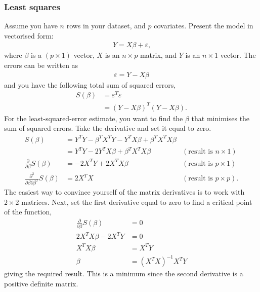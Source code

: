 \documentclass[a4paper]{article}
\begin{document}
\subsubsection{Least squares}
Assume you have $n$ rows in your dataset, and $p$ covariates.
Present the model in vectorised form:
\begin{align*}
Y = X \beta + \varepsilon
\text{,}
\end{align*}
where $\beta$ is a $(p \times 1)$ vector,
$X$ is an $n \times p$ matrix, and
$Y$ is an $n \times 1$ vector.
The errors can be written as
\begin{align*}
\varepsilon = Y-X \beta
\end{align*}
and you have the following total sum of squared errors,
\begin{align*}
S(\beta) &= \varepsilon^T \varepsilon \\
&= (Y-X\beta)^T (Y-X\beta)
\text{.}
\end{align*}
For the least-squared-error estimate, you want to find the $\beta$ that minimises the sum of squared errors. Take the derivative and set it equal to zero.
\begin{align*}
  S(\beta)
  &= Y^T Y -\beta^T X^T Y - Y^T X \beta + \beta^T X^T X \beta \\
  &= Y^T Y - 2 Y^T X \beta + \beta^T X^T X \beta
  & (\text{result is }n \times 1)
  \\
 \frac{\partial}{\partial\beta} S(\beta)
 &= - 2 X^T Y +
    2X^T X \beta
    & (\text{result is }p \times 1)
    \\
 \frac{\partial^2}{\partial\beta \partial\beta^T} S(\beta)
 &= 2
    X^T
    X
    & (\text{result is }p \times p)
    \text{.}
\end{align*}
The easiest way to convince yourself of the matrix derivatives is to work with $2 \times 2$ matrices.
Next, set the first derivative equal to zero to find a critical point of the function,
\begin{align*}
 \frac{\partial}{\partial\beta} S(\beta) &= 0 \\
  2X^T X \beta - 2 X^T Y &= 0 \\
  X^T X \beta &=  X^T Y  \\
   \beta &= (X^T X)^{-1} X^T Y
\end{align*}
giving the required result.
This is a minimum since the second derivative is a positive definite matrix.
\end{document}
